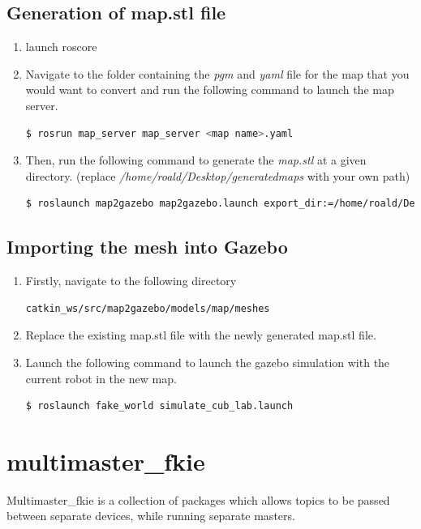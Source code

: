 \documentclass[11pt]{article}
\begin{document}
\subsection{Generation of map.stl file}

\begin{enumerate}
 \item{launch roscore}
 \item {
       Navigate to the folder containing the \emph{pgm} and \emph{yaml} file for the map that you would want to convert and run the following command to launch the map server.
       \begin{lstlisting}[language=bash]
        $ rosrun map_server map_server <map name>.yaml
       \end{lstlisting}
       }
 \item{
       Then, run the following command to generate the \emph{map.stl} at a given directory. (replace
       \emph{/home/roald/Desktop/generatedmaps} with your own path)
       
       \begin{lstlisting}[language=bash]
        $ roslaunch map2gazebo map2gazebo.launch export_dir:=/home/roald/Desktop/generatedmaps
        \end{lstlisting}
       }
\end{enumerate}
\subsection{Importing the mesh into Gazebo}
\begin{enumerate}
 \item {
       Firstly, navigate to the following directory
       \begin{lstlisting}[language=bash]
 catkin_ws/src/map2gazebo/models/map/meshes
        \end{lstlisting}
       }
 \item {
       Replace the existing map.stl file with the newly generated map.stl file.
       }
 \item{
       Launch the following command to launch the gazebo simulation with the current robot in the new map.
       \begin{lstlisting}[language=bash]
       $ roslaunch fake_world simulate_cub_lab.launch
        \end{lstlisting}
       
       }
\end{enumerate}

\section{multimaster\_fkie}
Multimaster\_fkie is a collection of packages which allows topics to be passed between separate devices, while running separate masters.
\end{document}

